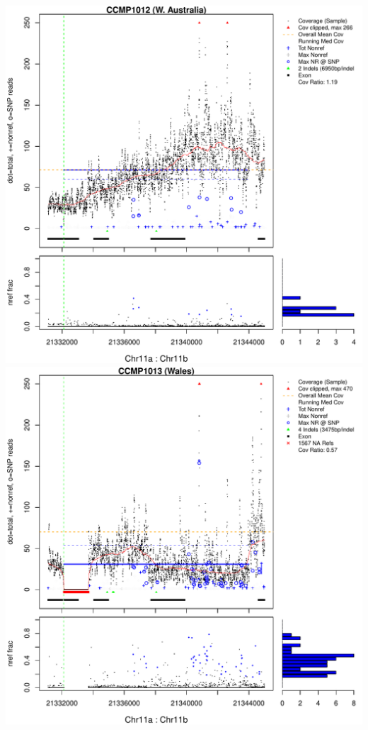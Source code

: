 \documentclass{article}\usepackage[]{graphicx}\usepackage[]{color}
\makeatletter
\def\maxwidth{ %
  \ifdim\Gin@nat@width>\linewidth
    \linewidth
  \else
    \Gin@nat@width
  \fi
}
\newenvironment{knitrout}{}{} %
\makeatother
\begin{document}
\begin{knitrout}
{\includegraphics[width=\maxwidth]{figs-knitr/unnamed-chunk-52-3} 
\includegraphics[width=\maxwidth]{figs-knitr/unnamed-chunk-52-4} 
}
\end{knitrout}
\end{document}

